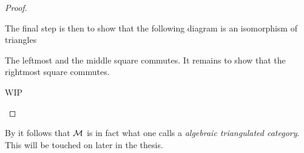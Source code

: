 \begin{proof}
\begin{enumerate}[label={(\bfseries TR\arabic*)}]
{            The final step is then to show that the following diagram is an isomorphism of triangles
            \begin{center}
            \end{center}

            The leftmost and the middle square commutes. It remains to show that the rightmost square commutes.

            WIP
        }
    \end{enumerate}
\end{proof}

By \cite[Lemma, Subsection 7.5]{Krause_2007} it follows that \( {\mathcal{M}} \) is in fact what one calls a \emph{algebraic triangulated category}. This will be touched on later in the thesis. %